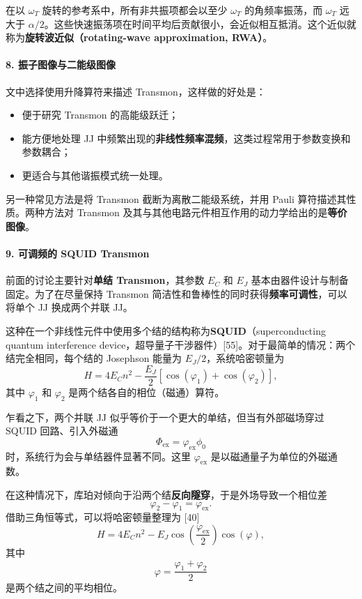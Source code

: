 \documentclass[12pt,a4paper,oneside]{ctexbook}
\begin{document}
在以 \(\omega_T\) 旋转的参考系中，所有非共振项都会以至少 \(\omega_T\) 的角频率振荡，而 \(\omega_T\) 远大于 \(\alpha/2\)。这些快速振荡项在时间平均后贡献很小，会近似相互抵消。这个近似就称为\textbf{旋转波近似（rotating-wave approximation, RWA）}。

\paragraph{8. 振子图像与二能级图像}

文中选择使用升降算符来描述 Transmon，这样做的好处是：
\begin{itemize}[leftmargin=2em]
    \item 便于研究 Transmon 的高能级跃迁；
    \item 能方便地处理 JJ 中频繁出现的\textbf{非线性频率混频}，这类过程常用于参数变换和参数耦合；
    \item 更适合与其他谐振模式统一处理。
\end{itemize}

另一种常见方法是将 Transmon 截断为离散二能级系统，并用 Pauli 算符描述其性质。两种方法对 Transmon 及其与其他电路元件相互作用的动力学给出的是\textbf{等价图像}。

\paragraph{9. 可调频的 SQUID Transmon}

前面的讨论主要针对\textbf{单结 Transmon}，其参数 \(E_C\) 和 \(E_J\) 基本由器件设计与制备固定。为了在尽量保持 Transmon 简洁性和鲁棒性的同时获得\textbf{频率可调性}，可以将单个 JJ 换成两个并联 JJ。

这种在一个非线性元件中使用多个结的结构称为\textbf{SQUID}（superconducting quantum interference device，超导量子干涉器件）[55]。对于最简单的情况：两个结完全相同，每个结的 Josephson 能量为 \(E_J/2\)，系统哈密顿量为
\begin{equation}
    H=4E_Cn^2-\frac{E_J}{2}\left[\cos(\varphi_1)+\cos(\varphi_2)\right],
    \tag{19}
\end{equation}
其中 \(\varphi_1\) 和 \(\varphi_2\) 是两个结各自的相位（磁通）算符。

乍看之下，两个并联 JJ 似乎等价于一个更大的单结，但当有外部磁场穿过 SQUID 回路、引入外磁通
\[
    \Phi_{\mathrm{ex}}=\varphi_{\mathrm{ex}}\phi_0
\]
时，系统行为会与单结器件显著不同。这里 \(\varphi_{\mathrm{ex}}\) 是以磁通量子为单位的外磁通数。

在这种情况下，库珀对倾向于沿两个结\textbf{反向隧穿}，于是外场导致一个相位差
\[
    \varphi_2-\varphi_1=\varphi_{\mathrm{ex}}.
\]
借助三角恒等式，可以将哈密顿量整理为 [40]
\begin{equation}
    H
    =
    4E_Cn^2
    -
    E_J\cos\!\left(\frac{\varphi_{\mathrm{ex}}}{2}\right)\cos(\varphi),
    \tag{20}
\end{equation}
其中
\[
    \varphi=\frac{\varphi_1+\varphi_2}{2}
\]
是两个结之间的平均相位。
\end{document}
